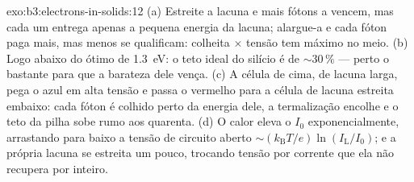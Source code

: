\begin{solution}{exo:b3:electrons-in-solids:12}
(a) Estreite a lacuna e mais fótons a vencem, mas cada um entrega
apenas a pequena energia da lacuna; alargue-a e cada fóton paga mais,
mas menos se qualificam: colheita $\times$ tensão tem máximo no meio.
(b) Logo abaixo do ótimo de \qty{1.3}{eV}: o teto ideal do silício
é de $\sim30\,\%$ --- perto o bastante para que a barateza dele vença.
(c) A célula de cima, de lacuna larga, pega o azul em alta tensão e
passa o vermelho para a célula de lacuna estreita embaixo: cada fóton é
colhido perto da energia dele, a termalização encolhe e o teto da
pilha sobe rumo aos quarenta. (d) O calor eleva o $I_0$
exponencialmente, arrastando para baixo a tensão de circuito aberto
$\sim(k_{\text{B}}T/e)\ln(I_{\text{L}}/I_0)$; e a própria lacuna
se estreita um pouco, trocando tensão por corrente que ela não recupera
por inteiro.
\end{solution}

